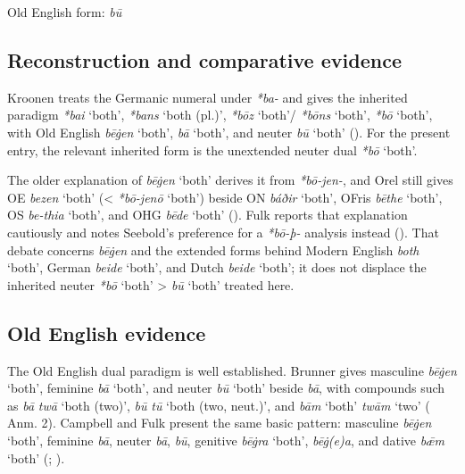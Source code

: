 \documentclass[
  british,
  a4paper,
  openany]{book}
\providecommand{\Recon}[1]{\emph{*#1}}
{\catcode`→=\active \global\def→{\ensuremath{\rightarrow}}}
\providecommand{\Recon}[1]{\emph{*#1}}
{\catcode`→=\active \global\def→{\ensuremath{\rightarrow}}}
\begin{document}
Old English form: \emph{bū}

\subsection{Reconstruction and comparative
evidence}\label{reconstruction-and-comparative-evidence-7}

Kroonen treats the Germanic numeral under \emph{*ba-} and gives the
inherited paradigm \Recon{bai} `both', \Recon{bans} `both (pl.)',
\Recon{bōz} `both'/ \Recon{bōns} `both', \Recon{bō} `both', with Old
English {\emph{bēġen}} `both', {\emph{bā}} `both', and neuter
{\emph{bū}} `both' (). For
the present entry, the relevant inherited form is the unextended neuter
dual {\emph{*bō}} `both'.

The older explanation of {\emph{bēġen}} `both' derives it from
\emph{*bō-jen-}, and Orel still gives OE {\emph{bezen}} `both'
(\textless{} \Recon{bō-jenō} `both') beside ON {\emph{báðir}} `both',
OFris {\emph{bēthe}} `both', OS {\emph{be-thia}} `both', and OHG
{\emph{bēde}} `both' (). Fulk
reports that explanation cautiously and notes Seebold's preference for a
\emph{*bō-þ-} analysis instead (). That debate concerns {\emph{bēġen}} and the extended forms
behind Modern English {\emph{both}} `both', German {\emph{beide}}
`both', and Dutch {\emph{beide}} `both'; it does not displace the
inherited neuter {\emph{*bō}} `both' \textgreater{} {\emph{bū}} `both'
treated here.

\subsection{Old English evidence}\label{old-english-evidence-7}

The Old English dual paradigm is well established. Brunner gives
masculine {\emph{bēġen}} `both', feminine {\emph{bā}} `both', and neuter
{\emph{bū}} `both' beside \emph{bā}, with compounds such as \emph{bā}
\emph{twā} `both (two)', \emph{bū} \emph{tū} `both (two, neut.)', and
\emph{bām} `both' \emph{twām} `two'
( Anm. 2).
Campbell and Fulk present the same basic pattern: masculine
{\emph{bēġen}} `both', feminine \emph{bā}, neuter \emph{bā}, \emph{bū},
genitive \emph{bēġra} `both', \emph{bēġ(e)a}, and dative {\emph{bǣm}}
`both' (;
).
\end{document}
